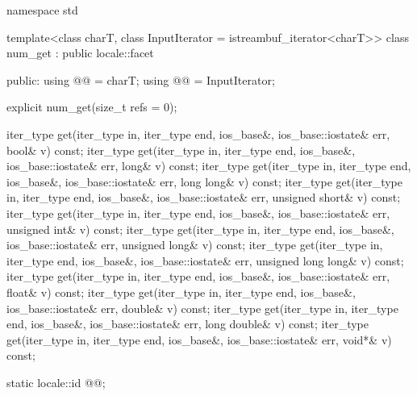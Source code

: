 %
\begin{codeblock}
namespace std {
  template<class charT, class InputIterator = istreambuf_iterator<charT>>
  class num_get : public locale::facet {
  public:
    using @@ = charT;
    using @@ = InputIterator;

    explicit num_get(size_t refs = 0);

    iter_type get(iter_type in, iter_type end, ios_base&,
                  ios_base::iostate& err, bool& v) const;
    iter_type get(iter_type in, iter_type end, ios_base&,
                  ios_base::iostate& err, long& v) const;
    iter_type get(iter_type in, iter_type end, ios_base&,
                  ios_base::iostate& err, long long& v) const;
    iter_type get(iter_type in, iter_type end, ios_base&,
                  ios_base::iostate& err, unsigned short& v) const;
    iter_type get(iter_type in, iter_type end, ios_base&,
                  ios_base::iostate& err, unsigned int& v) const;
    iter_type get(iter_type in, iter_type end, ios_base&,
                  ios_base::iostate& err, unsigned long& v) const;
    iter_type get(iter_type in, iter_type end, ios_base&,
                  ios_base::iostate& err, unsigned long long& v) const;
    iter_type get(iter_type in, iter_type end, ios_base&,
                  ios_base::iostate& err, float& v) const;
    iter_type get(iter_type in, iter_type end, ios_base&,
                  ios_base::iostate& err, double& v) const;
    iter_type get(iter_type in, iter_type end, ios_base&,
                  ios_base::iostate& err, long double& v) const;
    iter_type get(iter_type in, iter_type end, ios_base&,
                  ios_base::iostate& err, void*& v) const;

    static locale::id @@;

}}
\end{codeblock}
